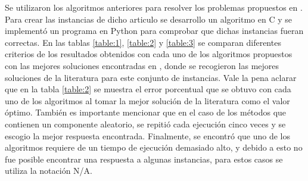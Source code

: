 \documentclass[10pt, twoside]{article}
\begin{document}
Se utilizaron los algoritmos anteriores para resolver los problemas
propuestos en \cite{dataset}. Para crear las instancias de dicho articulo se desarrollo
un algoritmo en C y se implementó un programa en Python para comprobar que dichas
instancias fueran correctas. En las tablas \ref{table:1}, \ref{table:2} y
\ref{table:3} se comparan diferentes criterios de los resultados obtenidos con
cada uno de los algoritmos propuestos con las mejores soluciones encontradas en
\cite{literature}, donde se recogieron las mejores soluciones de la literatura para este
conjunto de instancias. Vale la pena aclarar que en la tabla \ref{table:2} se
muestra el error porcentual que se obtuvo con cada uno de los algoritmos al tomar la mejor
solución de la literatura como el valor óptimo. También es importante mencionar
que en el caso de los métodos que contienen un componente aleatorio, se repitió
cada ejecución cinco veces y se escogio la mejor respuesta encontrada.
Finalmente, se encontró que uno de los algoritmos requiere de un tiempo de
ejecución demasiado alto, y debido a esto no fue posible encontrar una
respuesta a algunas instancias, para estos casos se utiliza la notación N/A.
\end{document}
